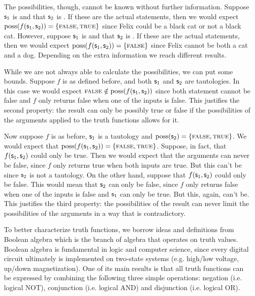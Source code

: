 \documentclass[11pt,letterpaper,fleqn]{memoir} %
\begin{document}
\begin{mathSection}
\begin{justification}
		The possibilities, though, cannot be known without further information. Suppose $\mathsf{s}_1$ is  and that $\mathsf{s}_2$ is . If these are the actual statements, then we would expect $\operatorname{poss}(f(\mathsf{s}_1, \mathsf{s}_2)) = \{\textsc{false}, \textsc{true}\}$ since Felix could be a black cat or not a black cat. However, suppose $\mathsf{s}_1$ is  and that $\mathsf{s}_2$ is . If these are the actual statements, then we would expect $\operatorname{poss}(f(\mathsf{s}_1, \mathsf{s}_2)) = \{\textsc{false}\}$ since Felix cannot be both a cat and a dog. Depending on the extra information we reach different results.
		
		While we are not always able to calculate the possibilities, we can put some bounds. Suppose $f$ is as defined before, and both $\mathsf{s}_1$ and $\mathsf{s}_2$ are tautologies. In this case we would expect $\textsc{false} \notin \operatorname{poss}(f(\mathsf{s}_1, \mathsf{s}_2))$ since both statement cannot be false and $f$ only returns false when one of the inputs is false. This justifies the second property: the result can only be possibly true or false if the possibilities of the arguments applied to the truth functions allows for it.
		
		Now suppose $f$ is as before, $\mathsf{s}_1$ is a tautology and $\operatorname{poss}(\mathsf{s}_2) = \{\textsc{false}, \textsc{true}\}$. We would expect that  $\operatorname{poss}(f(\mathsf{s}_1, \mathsf{s}_2)) = \{\textsc{false}, \textsc{true}\}$. Suppose, in fact, that $f(\mathsf{s}_1, \mathsf{s}_2)$ could only be true. Then we would expect that the arguments can never be false, since $f$ only returns true when both inputs are true. But this can't be since $\mathsf{s}_2$ is not a tautology. On the other hand, suppose that $f(\mathsf{s}_1, \mathsf{s}_2)$ could only be false. This would mean that $\mathsf{s}_2$ can only be false, since $f$ only returns false when one of the inputs is false and $\mathsf{s}_1$ can only be true. But this, again, can't be. This justifies the third property: the possibilities of the result can never limit the possibilities of the arguments in a way that is contradictory.	
	\end{justification}
\end{mathSection}

To better characterize truth functions, we borrow ideas and definitions from Boolean algebra which is the branch of algebra that operates on truth values. Boolean algebra is fundamental in logic and computer science, since every digital circuit ultimately is implemented on two-state systems (e.g. high/low voltage, up/down magnetization).  One of its main results is that all truth functions can be expressed by combining the following three simple operations: negation (i.e. logical NOT), conjunction (i.e. logical AND) and disjunction (i.e. logical OR).
\end{document}
